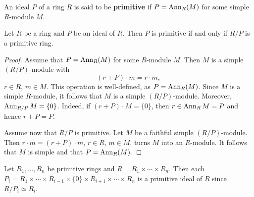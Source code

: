 \chapter{}
\label{04}

\begin{definition}
An ideal $P$ of a ring $R$ is said to be \textbf{primitive} if $P=\operatorname{Ann}_R(M)$
for some simple $R$-module $M$. 
\end{definition}

\begin{lemma}
	\label{lemma:primitivo}
	Let $R$ be a ring and $P$ be an ideal of $R$. Then $P$ is primitive if and only if 
	$R/P$ is a primitive ring.
\end{lemma}

\begin{proof}
	Assume that $P=\operatorname{Ann}_R(M)$ for some $R$-module $M$. Then $M$ is a simple 
	$(R/P)$-module with 
	\[
	(r+P)\cdot m=r\cdot m,
	\]
	$r\in R$, $m\in M$. This operation 
	is well-defined, as 
	$P=\operatorname{Ann}_R(M)$. Since $M$ is a simple $R$-module, it follows that $M$ is 
	a simple $(R/P)$-module. Moreover, $\operatorname{Ann}_{R/P}M=\{0\}$. Indeed, if 
	$(r+P)\cdot M=\{0\}$, then $r\in\operatorname{Ann}_RM=P$ and hence $r+P=P$.

	Assume now that $R/P$ is primitive. Let $M$ be a faithful simple $(R/P)$-module. 
	Then $r\cdot m=(r+P)\cdot m$, $r\in R$,
	$m\in M$, turns $M$ into an $R$-module. It follows that $M$ is simple and that $P=\operatorname{Ann}_R(M)$. 
\end{proof}



\begin{example}
	Let $R_1,\dots,R_n$ be primitive rings and $R=R_1\times\cdots\times
	R_n$. Then each $P_i=R_1\times\cdots\times R_{i-1}\times\{0\}\times
	R_{i+1}\times\cdots\times R_n$ is a primitive ideal of $R$ since 
	$R/P_i\simeq R_i$.
\end{example}

